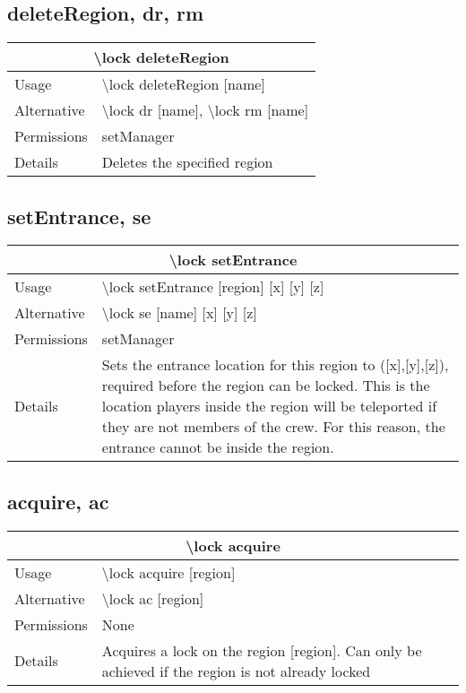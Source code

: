 \documentclass[a4paper,twoside,notitlepage,11pt]{article}
\begin{document}
\subsection{deleteRegion, dr, rm}
\begin{center}
\begin{tabular}{|p{2cm}|p{12.5cm}|} \hline
\multicolumn{2}{|c|}{\textbf{\textbackslash lock deleteRegion}} \\ \hline
Usage       & \textbackslash lock deleteRegion [name] \\ \hline
Alternative & \textbackslash lock dr [name], \textbackslash lock rm [name] \\ \hline
Permissions & setManager \\ \hline
Details 	& Deletes the specified region \\ \hline
\end{tabular}
\end{center}

\subsection{setEntrance, se}
\begin{center}
\begin{tabular}{|p{2cm}|p{12.5cm}|} \hline
\multicolumn{2}{|c|}{\textbf{\textbackslash lock setEntrance}} \\ \hline
Usage       & \textbackslash lock setEntrance [region] [x] [y] [z]\\ \hline
Alternative & \textbackslash lock se [name] [x] [y] [z]\\ \hline
Permissions & setManager \\ \hline
Details 	& Sets the entrance location for this region to ([x],[y],[z]), required before the region can be locked. This is the location players inside the region will be teleported if they are not members of the crew. For this reason, the entrance cannot be inside the region.\\ \hline
\end{tabular}
\end{center}

\subsection{acquire, ac}
\begin{center}
\begin{tabular}{|p{2cm}|p{12.5cm}|} \hline
\multicolumn{2}{|c|}{\textbf{\textbackslash lock acquire}} \\ \hline
Usage       & \textbackslash lock acquire [region] \\ \hline
Alternative & \textbackslash lock ac [region] \\ \hline
Permissions & None \\ \hline
Details 	& Acquires a lock on the region [region]. Can only be achieved if the region is not already locked \\ \hline
\end{tabular}
\end{center}
\end{document}
